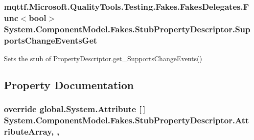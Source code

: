 \hypertarget{class_system_1_1_component_model_1_1_fakes_1_1_stub_property_descriptor_ad6d7efd49ace4fd2edc7aec6ae59f00c}{
\subsubsection[{Supports\-Change\-Events\-Get}]{\setlength{\rightskip}{0pt plus 5cm}mqttf.\-Microsoft.\-Quality\-Tools.\-Testing.\-Fakes.\-Fakes\-Delegates.\-Func$<$bool$>$ System.\-Component\-Model.\-Fakes.\-Stub\-Property\-Descriptor.\-Supports\-Change\-Events\-Get}}\label{class_system_1_1_component_model_1_1_fakes_1_1_stub_property_descriptor_ad6d7efd49ace4fd2edc7aec6ae59f00c}


Sets the stub of Property\-Descriptor.\-get\-\_\-\-Supports\-Change\-Events()



\subsection{Property Documentation}
\hypertarget{class_system_1_1_component_model_1_1_fakes_1_1_stub_property_descriptor_affe1c4f1b4240efd9e5ba8fbd65c3b4c}{
\subsubsection[{Attribute\-Array}]{\setlength{\rightskip}{0pt plus 5cm}override global.\-System.\-Attribute \mbox{[}$\,$\mbox{]} System.\-Component\-Model.\-Fakes.\-Stub\-Property\-Descriptor.\-Attribute\-Array\hspace{0.3cm}{\ttfamily [get]}, {\ttfamily [set]}, {\ttfamily [protected]}}}\label{class_system_1_1_component_model_1_1_fakes_1_1_stub_property_descriptor_affe1c4f1b4240efd9e5ba8fbd65c3b4c}


